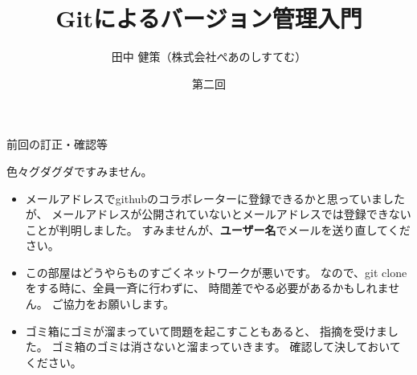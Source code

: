 \documentclass[12pt, unicode]{beamer}
\title{Gitによるバージョン管理入門}
\author{田中 健策（株式会社ぺあのしすてむ）}
\date[2019/10/11]{第二回}
\begin{document}
\frame{\maketitle}

\begin{frame}{前回の訂正・確認等}

色々グダグダですみません。

\begin{itemize}
\item メールアドレスでgithubのコラボレーターに登録できるかと思っていましたが、
メールアドレスが公開されていないとメールアドレスでは登録できないことが判明しました。
すみませんが、\textbf{ユーザー名}でメールを送り直してください。

\item この部屋はどうやらものすごくネットワークが悪いです。
なので、git cloneをする時に、全員一斉に行わずに、
時間差でやる必要があるかもしれません。
ご協力をお願いします。

\item ゴミ箱にゴミが溜まっていて問題を起こすこともあると、
指摘を受けました。
ゴミ箱のゴミは消さないと溜まっていきます。
確認して決しておいてください。

\end{itemize}

\end{frame}
\end{document}
